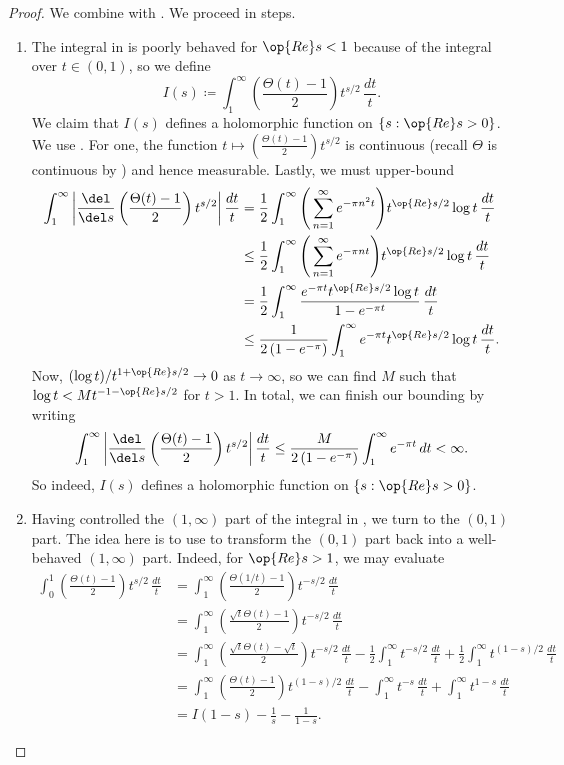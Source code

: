 \documentclass[../notes.tex]{subfiles}
\begin{document}
\begin{proof}
	We combine  with . We proceed in steps.
	\begin{enumerate}
		\item The integral in  is poorly behaved for $\op{Re}s<1$ because of the integral over $t\in(0,1)$, so we define
		\[I(s)\coloneqq\int_1^\infty\left(\frac{\Theta(t)-1}2\right)t^{s/2}\,\frac{dt}t.\]
		We claim that $I(s)$ defines a holomorphic function on $\{s:\op{Re}s>0\}$. We use . For one, the function $t\mapsto\left(\frac{\Theta(t)-1}2\right)t^{s/2}$ is continuous (recall $\Theta$ is continuous by ) and hence measurable. Lastly, we must upper-bound
		\begin{align*}
			\int_1^\infty\left|\frac{\del}{\del s}\left(\frac{\Theta(t)-1}2\right)t^{s/2}\right|\frac{dt}t &= \frac12\int_1^\infty\Bigg(\sum_{n=1}^\infty e^{-\pi n^2t}\Bigg)t^{\op{Re}s/2}\log t\,\frac{dt}t \\
			&\le \frac12\int_1^\infty\Bigg(\sum_{n=1}^\infty e^{-\pi nt}\Bigg)t^{\op{Re}s/2}\log t\,\frac{dt}t \\
			&= \frac12\int_1^\infty\frac{e^{-\pi t}t^{\op{Re}s/2}\log t}{1-e^{-\pi t}}\,\frac{dt}t \\
			&\le \frac1{2\left(1-e^{-\pi}\right)}\int_1^\infty e^{-\pi t}t^{\op{Re}s/2}\log t\,\frac{dt}t.
		\end{align*}
		Now, $(\log t)/t^{1+\op{Re}s/2}\to0$ as $t\to\infty$, so we can find $M$ such that $\log t<Mt^{-1-\op{Re}s/2}$ for $t>1$. In total, we can finish our bounding by writing
		\[\int_1^\infty\left|\frac{\del}{\del s}\left(\frac{\Theta(t)-1}2\right)t^{s/2}\right|\frac{dt}t\le\frac M{2\left(1-e^{-\pi}\right)}\int_1^\infty e^{-\pi t}\,dt<\infty.\]
		So indeed, $I(s)$ defines a holomorphic function on $\{s:\op{Re}s>0\}$.
	
		\item Having controlled the $(1,\infty)$ part of the integral in , we turn to the $(0,1)$ part. The idea here is to use  to transform the $(0,1)$ part back into a well-behaved $(1,\infty)$ part. Indeed, for $\op{Re}s>1$, we may evaluate
		\begin{align*}
			\int_0^1\left(\frac{\Theta(t)-1}2\right)t^{s/2}\,\frac{dt}t &= \int_1^\infty\left(\frac{\Theta(1/t)-1}2\right)t^{-s/2}\,\frac{dt}t \\
			&= \int_1^\infty\left(\frac{\sqrt t\Theta(t)-1}2\right)t^{-s/2}\,\frac{dt}t \\
			&= \int_1^\infty\left(\frac{\sqrt t\Theta(t)-\sqrt t}2\right)t^{-s/2}\,\frac{dt}t-\frac12\int_1^\infty t^{-s/2}\,\frac{dt}t+\frac12\int_1^\infty t^{(1-s)/2}\,\frac{dt}t \\
			&= \int_1^\infty\left(\frac{\Theta(t)-1}2\right)t^{(1-s)/2}\,\frac{dt}t-\int_1^\infty t^{-s}\,\frac{dt}t+\int_1^\infty t^{1-s}\,\frac{dt}t \\
			&= I(1-s)-\frac1s-\frac1{1-s}.
		\end{align*}


\end{enumerate}
\end{proof}
\end{document}
